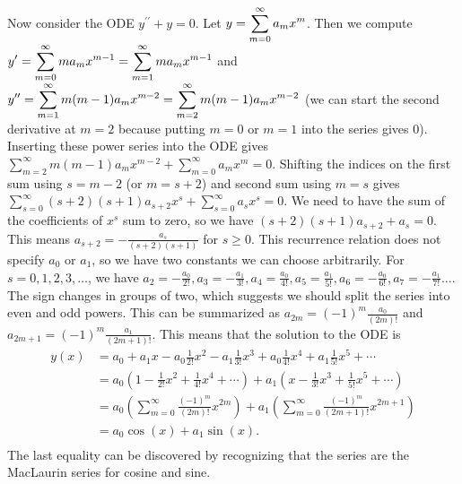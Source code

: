Now consider the ODE $y^{\prime\prime}+y=0$.  Let $\displaystyle y=\sum_{m=0}^\infty a_m x^m$.  Then we compute 
$\displaystyle y^\prime 
= \sum_{m=0}^\infty m a_m x^{m-1} 
= \sum_{m=1}^\infty m a_m x^{m-1} 
$ and 
$\displaystyle y^{\prime \prime }
= \sum_{m=1}^\infty m(m-1) a_m x^{m-2} 
= \sum_{m=2}^\infty m(m-1) a_m x^{m-2} 
$ (we can start the second derivative at $m=2$ because putting $m=0$ or $m=1$ into the series gives 0).
Inserting these power series into the ODE gives $\sum_{m=2}^\infty m(m-1) a_m x^{m-2}+\sum_{m=0}^\infty a_m x^m=0$.  Shifting the indices on the first sum using $s=m-2$ (or $m=s+2$) and second sum using $m=s$ gives $\sum_{s=0}^\infty (s+2)(s+1) a_{s+2} x^{s}+\sum_{s=0}^\infty a_s x^s=0$. We need to have the sum of the coefficients of $x^s$ sum to zero, so we have $(s+2)(s+1) a_{s+2} + a_s=0$.  This means $a_{s+2} = -\frac{a_s}{(s+2)(s+1)}$ for $s\geq 0$.  This recurrence relation does not specify $a_0$ or $a_1$, so we have two constants we can choose arbitrarily.  For $s=0,1,2,3,\ldots$, we have $a_{2} = -\frac{a_0}{2!}, a_{3} = -\frac{a_1}{3!},a_{4} = \frac{a_0}{4!},a_{5} = \frac{a_1}{5!},a_{6} = -\frac{a_0}{6!},a_{7} = -\frac{a_1}{7!}\ldots$. The sign changes in groups of two, which suggests we should split the series into even and odd powers. This can be summarized as $a_{2m}=(-1)^m\frac{a_0}{(2m)!}$ and $a_{2m+1}=(-1)^m\frac{a_1}{(2m+1)!}$.  This means that the solution to the ODE is 
\begin{align*}
y(x) &= a_0+a_1x-a_0\frac{1}{2!}x^2-a_1\frac{1}{3!}x^3+a_0\frac{1}{4!}x^4+a_1\frac{1}{5!}x^5+\cdots \\
&=a_0\left(1-\frac{1}{2!}x^2+\frac{1}{4!}x^4+\cdots\right)+a_1\left(x-\frac{1}{3!}x^3+\frac{1}{5!}x^5+\cdots\right)\\
&= a_0\left(\sum_{m=0}^\infty \frac{(-1)^m}{(2m)!}x^{2m}\right)+a_1\left(\sum_{m=0}^\infty \frac{(-1)^m}{(2m+1)!}x^{2m+1}\right)\\
&= a_0\cos(x)+a_1\sin(x).\\
\end{align*}
The last equality can be discovered by recognizing that the series are the MacLaurin series for cosine and sine.



